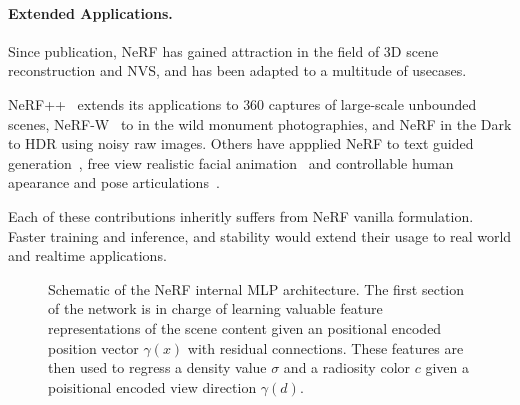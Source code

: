 \documentclass[runningheads]{llncs}
\begin{document}
\paragraph{\textbf{Extended Applications.}}

Since publication, \gls{NeRF} has gained attraction in the field of 3D scene reconstruction and \gls{NVS}, and has been adapted to a multitude of usecases.

NeRF++~\cite{Zhang2020} extends its applications to $360$ captures of large-scale unbounded scenes, NeRF-W~\cite{Martin2021} to in the wild monument photographies, and \gls{NeRF} in the Dark to \gls{HDR} using noisy raw images. Others have appplied \gls{NeRF} to text guided generation~\cite{Jain2021}, free view realistic facial animation~\cite{Athar2021} and controllable human apearance and pose articulations~\cite{Su2021}.

Each of these contributions inheritly suffers from \gls{NeRF} vanilla formulation. Faster training and inference, and stability would extend their usage to real world and realtime applications. 

  

\begin{figure}
  \centering
  \caption{Schematic of the \gls{NeRF} internal \gls{MLP} architecture. The first section of the network is in charge of learning valuable feature representations of the scene content given an positional encoded position vector $\gamma(x)$ with residual connections. These features are then used to regress a density value $\sigma$ and a radiosity color $c$ given a poisitional encoded view direction $\gamma(d)$.}
  \label{fig:architecture}
\end{figure}
\end{document}
